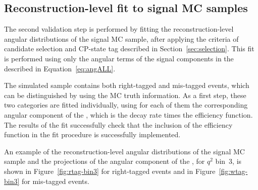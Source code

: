 
\clearpage

\subsection{Reconstruction-level fit to signal MC samples}
\label{sec:fitval-reco}

The second validation step is performed by fitting the reconstruction-level angular distributions of the signal MC sample, after applying the criteria of candidate selection and CP-state tag described in Section~\ref{sec:selection}.
This fit is performed using only the angular terms of the signal components in the \pdf described in Equation~\ref{eq:angALL}.

The simulated sample contains both right-tagged and mis-tagged events, which can be distinguished by using the MC truth information.
As a first step, these two categories are fitted individually, using for each of them the corresponding angular component of the \pdf, which is the decay rate times the efficiency function.
The results of the fit successfully check that the inclusion of the efficiency function in the fit procedure is successfully implemented.

An example of the reconstruction-level angular distributions of the signal MC sample and the projections of the angular component of the \pdf, for $q^2$ bin~3, is shown in Figure~\ref{fig:rtag-bin3} for right-tagged events and in Figure~\ref{fig:wtag-bin3} for mis-tagged events.



